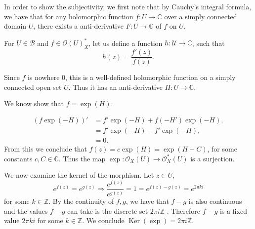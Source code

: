 \documentclass{article}
\DeclareMathOperator{\Ker}{Ker}
\begin{document}
\par In order to show the subjectivity, we first note that by Cauchy's integral formula, we have that for any holomorphic function $f:U\to\mathbb{C}$ over a simply connected domain $U$, there exists a anti-derivative $F:U\to\mathbb{C}$ of $f$ on $U$. \\
\par For $U\in\mathcal{B}$ and $f\in\mathcal{O}(U)^*_X$, let us define a function $h:\mathcal{U}\to\mathbb{C}$, such that
\begin{equation*}
h(z) = {\frac {f'(z)} {f(z)}}.
\end{equation*}

Since $f$ is nowhere $0$, this is a well-defined holomorphic function on a simply connected open set $U$. Thus it has an anti-derivative $H:U\to\mathbb{C}$.\\
\par We know show that $f=\exp(H)$. 

\begin{align*}
(f\exp(-H))' & = f'\exp(-H)+f(-H')\exp(-H),\\
& = f'\exp(-H)-f'\exp(-H),\\
& = 0.
\end{align*}
From this we conclude that $f(z) = c\exp(H)=\exp(H+C)$, for some constants $c,C\in\mathbb{C}$. Thus the map $\exp:\mathcal{O}_X(U)\to\mathcal{O}^*_X(U)$ is a surjection.

We now examine the kernel of the morphism. Let $z\in U$,
\begin{equation*}
e^{f(z)} = e^{g(z)} \Rightarrow {\frac {e^{f(z)}} {e^{g(z)}}} = 1 = e^{f(z)-g(z)} = e^{2\pi ki}
\end{equation*}
for some $k\in\mathbb{Z}$. By the continuity of $f,g$, we have that $f-g$ is also continuous and the values $f-g$ can take is the discrete set $2\pi i\mathbb{Z}$ . Therefore $f-g$ is a fixed value $2\pi ki$ for some $k\in\mathbb{Z}$. We conclude $\Ker(\exp)=2\pi i\mathbb{Z}$.
\end{document}
